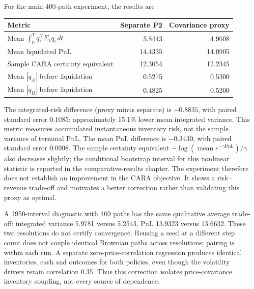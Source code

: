 For the main 400-path experiment, the results are
\begin{center}
\begin{tabular}{@{}lrr@{}}
\toprule
Metric & Separate P2 & Covariance proxy\\
\midrule
Mean $\int_0^Tq_t^\top\Sigma_tq_t\,dt$ & 5.8443 & 4.9608\\
Mean liquidated PnL & 14.4335 & 14.0905\\
Sample CARA certainty equivalent & 12.3054 & 12.2345\\
Mean $|q_A|$ before liquidation & 0.5275 & 0.5300\\
Mean $|q_B|$ before liquidation & 0.4825 & 0.5200\\
\bottomrule
\end{tabular}
\end{center}
The integrated-risk difference (proxy minus separate) is $-0.8835$, with paired standard error 0.1085: approximately 15.1\% lower mean integrated variance. This metric measures accumulated instantaneous inventory risk, not the sample variance of terminal PnL. The mean PnL difference is $-0.3430$, with paired standard error 0.0908. The sample certainty equivalent $-\log(\operatorname{mean}e^{-\gamma\mathrm{PnL}})/\gamma$ also decreases slightly; the conditional bootstrap interval for this nonlinear statistic is reported in the comparative-results chapter. The experiment therefore does not establish an improvement in the CARA objective. It shows a risk--revenue trade-off and motivates a better correction rather than validating this proxy as optimal.

A 1950-interval diagnostic with 400 paths has the same qualitative average trade-off: integrated variance 5.9781 versus 5.2543, PnL 13.9323 versus 13.6632. These two resolutions do not certify convergence. Reusing a seed at a different step count does not couple identical Brownian paths across resolutions; pairing is within each run. A separate zero-price-correlation regression produces identical inventories, cash and outcomes for both policies, even though the volatility drivers retain correlation 0.35. Thus this correction isolates price-covariance inventory coupling, not every source of dependence.
